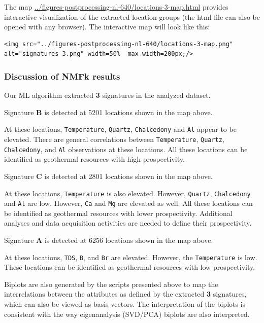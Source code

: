 \documentclass[11pt]{article}
\begin{document}
The map \url{../figures-postprocessing-nl-640/locations-3-map.html}
provides interactive visualization of the extracted location groups (the
html file can also be opened with any browser). The interactive map will
look like this:

\begin{verbatim}
<img src="../figures-postprocessing-nl-640/locations-3-map.png" alt="signatures-3.png" width=50%  max-width=200px;/>
\end{verbatim}

    \hypertarget{discussion-of-nmfk-results}{%
\subsubsection{Discussion of NMFk
results}\label{discussion-of-nmfk-results}}

Our ML algorithm extracted \textbf{3} signatures in the analyzed
dataset.

Signature \textbf{B} is detected at 5201 locations shown in the map
above.

At these locations, \texttt{Temperature}, \texttt{Quartz},
\texttt{Chalcedony} and \texttt{Al} appear to be elevated. There are
general correlations between \texttt{Temperature}, \texttt{Quartz},
\texttt{Chalcedony}, and \texttt{Al} observations at these locations.
All these locations can be identified as geothermal resources with high
prospectivity.

Signature \textbf{C} is detected at 2801 locations shown in the map
above.

At these locations, \texttt{Temperature} is also elevated. However,
\texttt{Quartz}, \texttt{Chalcedony} and \texttt{Al} are low. However,
\texttt{Ca} and \texttt{Mg} are elevated as well. All these locations
can be identified as geothermal resources with lower prospectivity.
Additional analyses and data acquisition activities are needed to define
their prospectivity.

Signature \textbf{A} is detected at 6256 locations shown in the map
above.

At these locations, \texttt{TDS}, \texttt{B}, and \texttt{Br} are
elevated. However, the \texttt{Temperature} is low. These locations can
be identified as geothermal resources with low prospectivity.

Biplots are also generated by the scripts presented above to map the
interrelations between the attributes as defined by the extracted
\textbf{3} signatures, which can also be viewed as basis vectors. The
interpretation of the biplots is consistent with the way eigenanalysis
(SVD/PCA) biplots are also interpreted.
\end{document}
